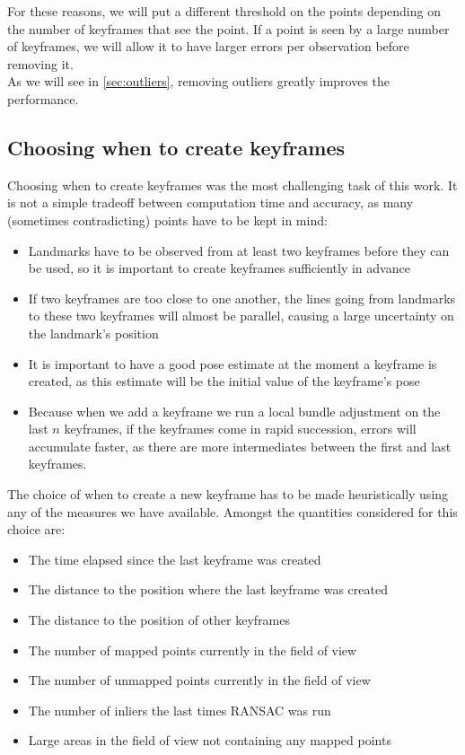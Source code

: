 For these reasons, we will put a different threshold on the points depending on the number of keyframes that see the point. If a point is seen by a large number of keyframes, we will allow it to have larger errors per observation before removing it.\\

As we will see in \ref{sec:outliers}, removing outliers greatly improves the performance.


\subsection{Choosing when to create keyframes}\label{sec:heuristic}
Choosing when to create keyframes was the most challenging task of this work. It is not a simple tradeoff between computation time and accuracy, as many (sometimes contradicting) points have to be kept in mind:
\begin{itemize}
\item Landmarks have to be observed from at least two keyframes before they can be used, so it is important to create keyframes sufficiently in advance
\item If two keyframes are too close to one another, the lines going from landmarks to these two keyframes will almost be parallel, causing a large uncertainty on the landmark's position
\item It is important to have a good pose estimate at the moment a keyframe is created, as this estimate will be the initial value of the keyframe's pose
\item Because when we add a keyframe we run a local bundle adjustment on the last $n$ keyframes, if the keyframes come in rapid succession, errors will accumulate faster, as there are more intermediates between the first and last keyframes.
\end{itemize}

The choice of when to create a new keyframe has to be made heuristically using any of the measures we have available. Amongst the quantities considered for this choice are:
\begin{itemize}
\item The time elapsed since the last keyframe was created
\item The distance to the position where the last keyframe was created
\item The distance to the position of other keyframes
\item The number of mapped points currently in the field of view
\item The number of unmapped points currently in the field of view
\item The number of inliers the last times RANSAC was run
\item Large areas in the field of view not containing any mapped points
\end{itemize}

